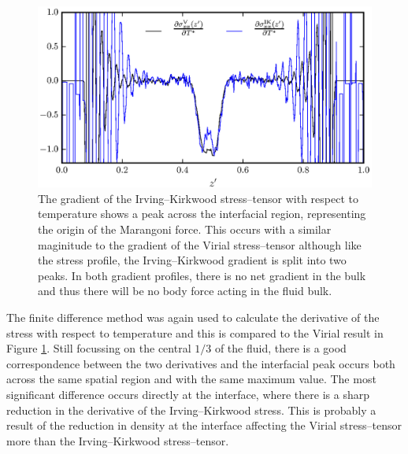 \begin{figure}[h]
\centering
\includegraphics[scale=0.8]{PisIKForce}
\caption{The gradient of the Irving--Kirkwood stress--tensor with respect to temperature shows a peak across the interfacial region, representing the origin of the Marangoni force. This occurs with a similar maginitude to the gradient of the Virial stress--tensor although like the stress profile, the Irving--Kirkwood gradient is split into two peaks.
In both gradient profiles, there is no net gradient in the bulk and thus there will be no body force acting in the fluid bulk.}
\label{PisIKForce}
\end{figure}
The finite difference method was again used to calculate the derivative of the stress with respect to temperature and this is compared to the Virial result in Figure \ref{PisIKForce}.
Still focussing on the central $1/3$ of the fluid, there is a good correspondence between the two derivatives and the interfacial peak occurs both across the same spatial region and with the same maximum value.
The most significant difference occurs directly at the interface, where there is a sharp reduction in the derivative of the Irving--Kirkwood stress.
This is probably a result of the reduction in density at the interface affecting the Virial stress--tensor more than the Irving--Kirkwood stress--tensor.
\FloatBarrier

